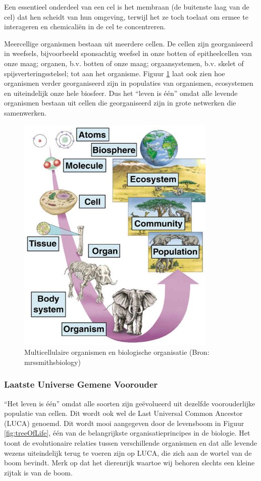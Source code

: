 \documentclass[
  11pt,
]{book}
\begin{document}
Een essentieel onderdeel van een cel is het membraan (de buitenste laag van de cel) dat hen scheidt van hun omgeving, terwijl het ze toch toelaat om ermee te interageren en chemicaliën in de cel te concentreren.

Meercellige organismen bestaan uit meerdere cellen. De cellen zijn georganiseerd in weefsels, bijvoorbeeld sponsachtig weefsel in onze botten of epitheelcellen van onze maag; organen, b.v. botten of onze maag; orgaansystemen, b.v. skelet of spijsverteringsstelsel; tot aan het organisme. Figuur \ref{fig:multiCellular} laat ook zien hoe organismen verder georganiseerd zijn in populaties van organismen, ecosystemen en uiteindelijk onze hele biosfeer. Dus het ``leven is één'' omdat alle levende organismen bestaan uit cellen die georganiseerd zijn in grote netwerken die samenwerken.

\begin{figure}

{\centering \includegraphics[width=0.3\linewidth]{./figs/organisationMulticellular} 

}

\caption{Multicellulaire organismen en biologische organisatie (Bron: mrssmithsbiology)}\label{fig:multiCellular}
\end{figure}

\pagebreak

\hypertarget{laatste-universe-gemene-voorouder}{%
\subsubsection{Laatste Universe Gemene Voorouder}\label{laatste-universe-gemene-voorouder}}

``Het leven is één'' omdat alle soorten zijn geëvolueerd uit dezelfde voorouderlijke populatie van cellen. Dit wordt ook wel de Last Universal Common Ancestor (LUCA) genoemd. Dit wordt mooi aangegeven door de levensboom in Figuur \ref{fig:treeOfLife}, één van de belangrijkste organisatieprincipes in de biologie. Het toont de evolutionaire relaties tussen verschillende organismen en dat alle levende wezens uiteindelijk terug te voeren zijn op LUCA, die zich aan de wortel van de boom bevindt. Merk op dat het dierenrijk waartoe wij behoren slechts een kleine zijtak is van de boom.
\end{document}
